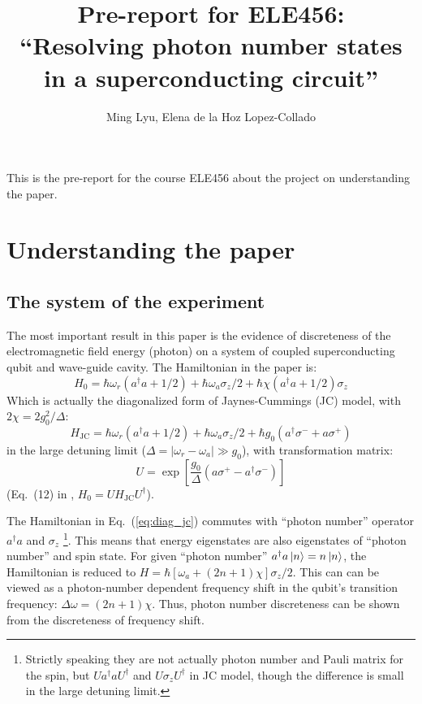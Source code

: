 \documentclass[12pt,notitlepage,nofootinbib]{revtex4-1}
\begin{document}
\title{Pre-report for ELE456: \\
``Resolving photon number states in a superconducting circuit''}
\author{Ming Lyu, Elena de la Hoz Lopez-Collado}
\maketitle
This is the pre-report for the course ELE456 about the project on understanding 
the paper\cite{schuster2007resolving}. 

\section{Understanding the paper}
\subsection{The system of the experiment}
The most important result in this paper is the evidence of discreteness of the 
electromagnetic field energy (photon) on a system of coupled superconducting 
qubit and wave-guide cavity. The Hamiltonian in the paper is: 
\begin{equation}\label{eq:diag_jc}
	H_0 = \hbar\omega_r(a^\dag a + 1/2) + \hbar \omega_a\sigma_z/2 + 
	\hbar\chi(a^\dag a + 1/2)\sigma_z
\end{equation}
Which is actually the diagonalized form of Jaynes-Cummings (JC) model, 
with $2\chi = 2g_0^2/\Delta$:
\begin{equation}\label{eq:bare_jc}
 	H_{\text{JC}} = \hbar\omega_r(a^\dag a +1/2) + \hbar\omega_a\sigma_z/2 + 
\hbar g_0(a^\dag\sigma^- + a\sigma^+)
\end{equation}
in the large detuning limit ($\Delta = |\omega_r - \omega_a| \gg g_0$), with 
transformation matrix:
\begin{equation}\label{eq:diag_matrix}
	U = \exp \left[\frac {g_0}\Delta(a\sigma^+ - a^\dag\sigma^-)\right]
\end{equation}
(Eq.~(12) in \cite{blais2004cavity}, $H_0 = UH_{\text{JC}}U^\dag$). 

The Hamiltonian in Eq.~(\ref{eq:diag_jc}) commutes with ``photon number'' 
operator $a^\dag a$ and $\sigma_z$ \footnote{Strictly speaking they are not 
actually photon number and Pauli matrix for the spin, but $U a^\dag a U^\dag$ 
and $U \sigma_z U^\dag$ in JC model, though the difference is small in the 
large detuning limit.}. This means that energy eigenstates are also eigenstates 
of ``photon number'' and spin state. For given ``photon number'' 
$a^\dag a \ket{n} = n\ket{n}$, the Hamiltonian is reduced to $H = \hbar
[\omega_a + (2n+1)\chi]\sigma_z/2$. This can can be viewed as a photon-number 
dependent frequency shift  in the qubit's transition frequency:
$\Delta \omega =(2n +1)\chi$. Thus, photon number discreteness can be shown from 
the discreteness of frequency shift.
\end{document}
